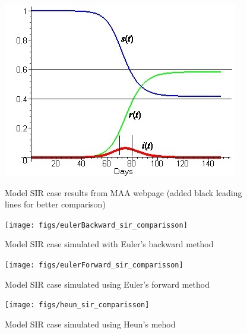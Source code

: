 \documentclass[a4paper]{article}
\begin{document}
\begin{figure}[h]
	\centering
	\begin{minipage}{.48\textwidth}
		\centering
		\includegraphics[width=1\linewidth]{figs/sir.jpg}
		\caption[Model case]{Model SIR case results from MAA webpage (added black leading lines for better comparison)}
		\label{fig:siqfrominternet}
	\end{minipage}%
	\begin{minipage}{.52\textwidth}
		\centering
		\texttt{[image: figs/eulerBackward\_sir\_comparisson]}
		\caption[Backward SIR]{Model SIR case simulated with Euler's backward method}
		\label{fig:eulerbackwardsircomparisson}
	\end{minipage}
\end{figure}
  
\begin{figure}[h]
	\centering
	\begin{minipage}{.5\textwidth}
		\centering
		\texttt{[image: figs/eulerForward\_sir\_comparisson]}
		\caption[Forward SIR]{Model SIR case simulated using Euler's forward method}
		\label{fig:eulerforwardsircomparisson}
	\end{minipage}%
	\begin{minipage}{.5\textwidth}
		\centering
		\texttt{[image: figs/heun\_sir\_comparisson]}
		\caption[Heun SIR]{Model SIR case simulated using Heun's mehod}
		\label{fig:heunsircomparisson}
	\end{minipage}
\end{figure}
\end{document}
